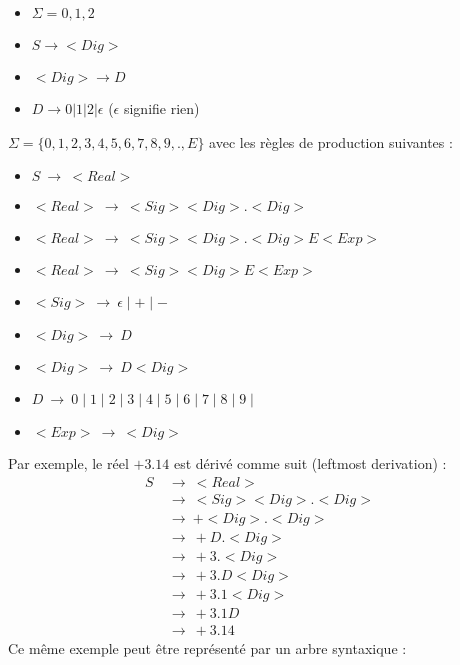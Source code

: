 \begin{myexem}
	\begin{itemize}
		\item $\Sigma ={0,1,2}$
		\item $S \rightarrow <Dig>$
		\item $<Dig> \rightarrow D$
		\item $D \rightarrow 0 | 1 |2 | \epsilon $ ($\epsilon$ signifie rien)
	\end{itemize}
\end{myexem}

\begin{myexem}
$\Sigma =\{0,1,2,3,4,5,6,7,8,9,.,E\}$ avec les règles de production suivantes :
\begin{itemize}
\item $S\ \rightarrow\ <Real>$
\item $<Real>\ \rightarrow\ <Sig><Dig>.<Dig>$
\item $<Real>\ \rightarrow\ <Sig><Dig>.<Dig>E<Exp>$
\item $<Real>\ \rightarrow\ <Sig><Dig>E<Exp>$
\item $<Sig>\ \rightarrow\ \epsilon\mid +\mid -$
\item $<Dig>\ \rightarrow\ D$
\item $<Dig>\ \rightarrow\ D<Dig>$
\item $D\ \rightarrow\ 0\mid 1\mid 2\mid 3\mid 4\mid 5\mid 6\mid 7\mid 8\mid 9\mid$
\item $<Exp>\ \rightarrow\ <Dig>$
\end{itemize}
Par exemple, le réel $+3.14$ est dérivé comme suit (leftmost derivation) :
\begin{align*}
S\ &\rightarrow\ <Real>\\
&\rightarrow\ <Sig><Dig>.<Dig>\\
&\rightarrow\ +<Dig>.<Dig>\\
&\rightarrow\ +D.<Dig>\\
&\rightarrow\ +3.<Dig>\\
&\rightarrow\ +3.D<Dig>\\
&\rightarrow\ +3.1<Dig>\\
&\rightarrow\ +3.1D\\
&\rightarrow\ +3.14
\end{align*}
Ce même exemple peut être représenté par un arbre syntaxique :
\begin{center}
\end{center}
\end{myexem}

